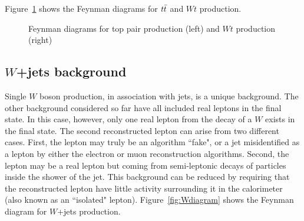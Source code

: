 Figure~\ref{fig:Topdiagram} shows the Feynman diagrams for $t\bar{t}$ and $Wt$ production.  

\begin{figure}[h!]
  \centering
  \captionsetup{justification=centering}

  \hspace{20pt}
  \caption{Feynman diagrams for top pair production (left) and $Wt$ production (right)}
  \label{fig:Topdiagram}
\end{figure}

\subsection{$W$+jets background}

Single $W$ boson production, in association with jets, is a unique background. The other background considered so far have all included real leptons in the final state. In this case, however, only one real lepton from the decay of a $W$ exists in the final state. The second reconstructed lepton can arise from two different cases. First, the lepton may truly be an algorithm ``fake", or a jet misidentified as a lepton by either the electron or muon reconstruction algorithms. Second, the lepton may be a real lepton but coming from semi-leptonic decays of particles inside the shower of the jet. This background can be reduced by requiring that the reconstructed lepton have little activity surrounding it in the calorimeter (also known as an ``isolated" lepton). Figure~\ref{fig:Wdiagram} shows the Feynman diagram for $W$+jets production. 


